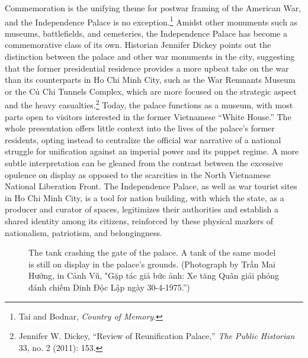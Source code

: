 \vi Commemoration is the unifying theme for postwar framing of the American War, and the Independence Palace is no exception.\footnote{Tai and Bodnar, \textit{Country of Memory}.} Amidst other monuments such as museums, battlefields, and cemeteries, the Independence Palace has become a commemorative class of its own. Historian Jennifer Dickey points out the distinction between the palace and other war monuments in the city, suggesting that the former presidential residence provides a more upbeat take on the war than its counterparts in Ho Chi Minh City, such as the War Remnants Museum or the Củ Chi Tunnels Complex, which are more focused on the strategic aspect and the heavy casualties.\footnote{Jennifer W. Dickey, “Review of Reunification Palace,” \textit{The Public Historian} 33, no. 2 (2011): 153.} Today, the palace functions as a museum, with most parts open to visitors interested in the former Vietnamese “White House.” The whole presentation offers little context into the lives of the palace’s former residents, opting instead to centralize the official war narrative of a national struggle for unification against an imperial power and its puppet regime. A more subtle interpretation can be gleaned from the contrast between the excessive opulence on display as opposed to the scarcities in the North Vietnamese National Liberation Front. The Independence Palace, as well as war tourist sites in Ho Chi Minh City, is a tool for nation building, with which the state, as a producer and curator of spaces, legitimizes their authorities and establish a shared identity among its citizens, reinforced by these physical markers of nationalism, patriotism, and belongingness.

\begin{figure}[!ht]
\begin{center}
\vspace{-.2 in}
\caption[Tank crashing gate of palace]{\vi The tank crashing the gate of the palace. A tank of the same model is still on display in the palace's grounds. (Photograph by Trần Mai Hưởng, in Cảnh Vũ, "Gặp tác giả bức ảnh: Xe tăng Quân giải phóng đánh chiếm Dinh Độc Lập ngày 30-4-1975.”\footnotemark)}\label{tank}
\end{center}
\vspace{-.2 in}
\end{figure}


